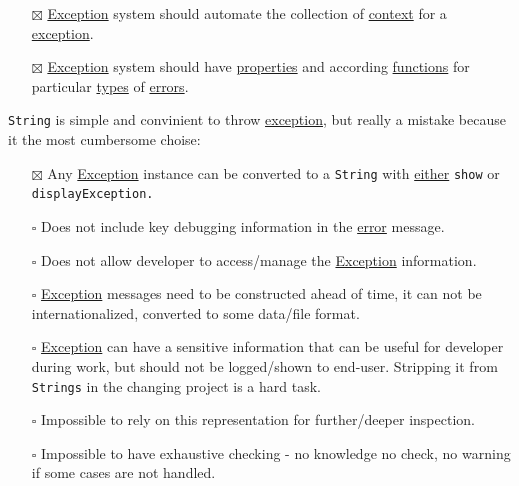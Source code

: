 \documentclass[a4paper,14pt,oneside]{book}
\begin{document}
\begin{itemize}
\item[{$\boxtimes$}] \hyperref[org4a5dbbf]{Exception} system should automate the collection of \hyperref[orgacc09e2]{context} for a \hyperref[org4a5dbbf]{exception}.\\
\item[{$\boxtimes$}] \hyperref[org4a5dbbf]{Exception} system should have \hyperref[org7d3e89a]{properties} and according \hyperref[org97ed87c]{functions} for particular \hyperref[orga478d03]{types} of \hyperref[orge2e4688]{errors}.\\
\end{itemize}

\texttt{String} is simple and convinient to throw \hyperref[org4a5dbbf]{exception}, but really a mistake because it the most cumbersome choise:\\
\begin{itemize}
\item[{$\boxtimes$}] Any \hyperref[org4a5dbbf]{Exception} instance can be converted to a \texttt{String} with \hyperref[orge1f01d3]{either} \texttt{show} or \texttt{displayException.}\\
\item[{$\square$}] Does not include key debugging information in the \hyperref[org7949068]{error} message.\\
\item[{$\square$}] Does not allow developer to access/manage the \hyperref[org4a5dbbf]{Exception} information.\\
\item[{$\square$}] \hyperref[org4a5dbbf]{Exception} messages need to be constructed ahead of time, it can not be internationalized, converted to some data/file format.\\
\item[{$\square$}] \hyperref[org4a5dbbf]{Exception} can have a sensitive information that can be useful for developer during work, but should not be logged/shown to end-user. Stripping it from \texttt{Strings} in the changing project is a hard task.\\
\item[{$\square$}] Impossible to rely on this representation for further/deeper inspection.\\
\item[{$\square$}] Impossible to have exhaustive checking - no knowledge no check, no warning if some cases are not handled.\\
\end{itemize}
\end{document}
